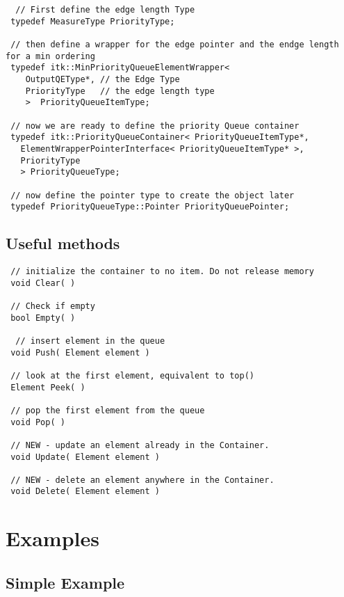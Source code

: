 \documentclass{InsightArticle}
\begin{document}
\begin{verbatim}
  // First define the edge length Type
 typedef MeasureType PriorityType;

 // then define a wrapper for the edge pointer and the endge length for a min ordering
 typedef itk::MinPriorityQueueElementWrapper<
    OutputQEType*, // the Edge Type
    PriorityType   // the edge length type
    >  PriorityQueueItemType;

 // now we are ready to define the priority Queue container
 typedef itk::PriorityQueueContainer< PriorityQueueItemType*,
   ElementWrapperPointerInterface< PriorityQueueItemType* >,
   PriorityType
   > PriorityQueueType;

 // now define the pointer type to create the object later
 typedef PriorityQueueType::Pointer PriorityQueuePointer;
\end{verbatim}

\subsection{Useful methods}

\begin{verbatim}
 // initialize the container to no item. Do not release memory
 void Clear( )

 // Check if empty
 bool Empty( )

  // insert element in the queue
 void Push( Element element )

 // look at the first element, equivalent to top()
 Element Peek( )

 // pop the first element from the queue
 void Pop( )

 // NEW - update an element already in the Container.
 void Update( Element element )

 // NEW - delete an element anywhere in the Container.
 void Delete( Element element )
\end{verbatim}

\section{Examples}

\subsection{Simple Example}
\end{document}
